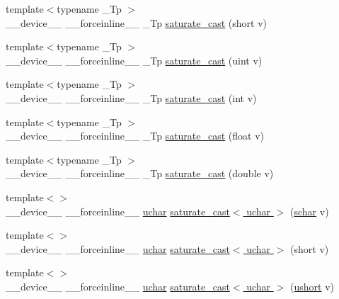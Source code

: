 \begin{DoxyCompactItemize}
\item 
{\footnotesize template$<$typename \-\_\-\-Tp $>$ }\\\-\_\-\-\_\-device\-\_\-\-\_\- \-\_\-\-\_\-forceinline\-\_\-\-\_\- \-\_\-\-Tp \hyperlink{namespacecv_1_1gpu_1_1device_a8f8fe0502f07c251fcc576211466391f}{saturate\-\_\-cast} (short v)
\item 
{\footnotesize template$<$typename \-\_\-\-Tp $>$ }\\\-\_\-\-\_\-device\-\_\-\-\_\- \-\_\-\-\_\-forceinline\-\_\-\-\_\- \-\_\-\-Tp \hyperlink{namespacecv_1_1gpu_1_1device_ab8070ea3ff40832e0df6f409bb519491}{saturate\-\_\-cast} (uint v)
\item 
{\footnotesize template$<$typename \-\_\-\-Tp $>$ }\\\-\_\-\-\_\-device\-\_\-\-\_\- \-\_\-\-\_\-forceinline\-\_\-\-\_\- \-\_\-\-Tp \hyperlink{namespacecv_1_1gpu_1_1device_a74686975bdcca756eb4763e196a129c8}{saturate\-\_\-cast} (int v)
\item 
{\footnotesize template$<$typename \-\_\-\-Tp $>$ }\\\-\_\-\-\_\-device\-\_\-\-\_\- \-\_\-\-\_\-forceinline\-\_\-\-\_\- \-\_\-\-Tp \hyperlink{namespacecv_1_1gpu_1_1device_a300b8c1ade6c603aba6d3e700c9a953e}{saturate\-\_\-cast} (float v)
\item 
{\footnotesize template$<$typename \-\_\-\-Tp $>$ }\\\-\_\-\-\_\-device\-\_\-\-\_\- \-\_\-\-\_\-forceinline\-\_\-\-\_\- \-\_\-\-Tp \hyperlink{namespacecv_1_1gpu_1_1device_a75d0aac70ef9e7ef0b285cdd73148758}{saturate\-\_\-cast} (double v)
\item 
{\footnotesize template$<$$>$ }\\\-\_\-\-\_\-device\-\_\-\-\_\- \-\_\-\-\_\-forceinline\-\_\-\-\_\- \hyperlink{core_2types__c_8h_a65f85814a8290f9797005d3b28e7e5fc}{uchar} \hyperlink{namespacecv_1_1gpu_1_1device_a3ca1fc82bf86d37cae0c983245d22432}{saturate\-\_\-cast$<$ uchar $>$} (\hyperlink{core_2types__c_8h_a0fd9ce9d735064461bebfe6037026093}{schar} v)
\item 
{\footnotesize template$<$$>$ }\\\-\_\-\-\_\-device\-\_\-\-\_\- \-\_\-\-\_\-forceinline\-\_\-\-\_\- \hyperlink{core_2types__c_8h_a65f85814a8290f9797005d3b28e7e5fc}{uchar} \hyperlink{namespacecv_1_1gpu_1_1device_aeeac98932b5d705ce0d84caf1314ca79}{saturate\-\_\-cast$<$ uchar $>$} (short v)
\item 
{\footnotesize template$<$$>$ }\\\-\_\-\-\_\-device\-\_\-\-\_\- \-\_\-\-\_\-forceinline\-\_\-\-\_\- \hyperlink{core_2types__c_8h_a65f85814a8290f9797005d3b28e7e5fc}{uchar} \hyperlink{namespacecv_1_1gpu_1_1device_a153f086f1af813ca60019f57d144a802}{saturate\-\_\-cast$<$ uchar $>$} (\hyperlink{core_2types__c_8h_ab95f123a6c9bcfee6a343170ef8c5f69}{ushort} v)

\end{DoxyCompactItemize}
